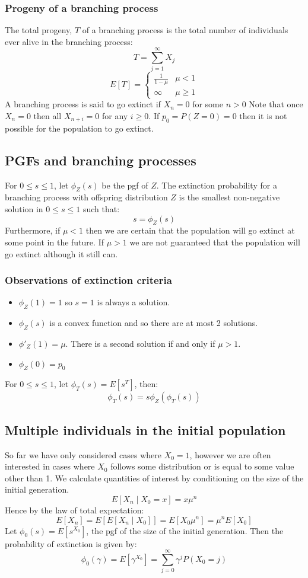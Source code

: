 \documentclass[12pt]{article}
\begin{document}
\subsubsection*{Progeny of a branching process}
The total progeny, \(T\) of a branching process is the total number of individuals ever alive in the branching process:
\[T=\sum^\infty_{j=1}X_j\]
\[E[T]=\begin{cases}
    \frac{1}{1-\mu} & \mu<1 \\
    \infty & \mu\geq 1
\end{cases}\]
A branching process is said to go extinct if \(X_n=0\) for some \(n>0\) Note that once \(X_n=0\) then all \(X_{n+i}=0\) for any \(i\geq 0\). If \(p_0=P(Z=0)=0\) then it is not possible for the population to go extinct.
\subsection*{PGFs and branching processes}
For \(0\leq s\leq 1\), let \(\phi_Z(s)\) be the pgf of \(Z\). The extinction probability for a branching process with offspring distribution \(Z\) is the smallest non-negative solution in \(0\leq s\leq 1\) such that:
\[s=\phi_Z(s)\]
Furthermore, if \(\mu<1\) then we are certain that the population will go extinct at some point in the future. If \(\mu>1\) we are not guaranteed that the population will go extinct although it still can.
\subsubsection*{Observations of extinction criteria}
\begin{itemize}
    \item \(\phi_Z(1)=1\) so \(s=1\) is always a solution.
    \item \(\phi_Z(s)\) is a convex function and so there are at most 2 solutions.
    \item \(\phi'_Z(1)=\mu\). There is a second solution if and only if \(\mu>1\).
    \item \(\phi_Z(0)=p_0\)
\end{itemize}
For \(0\leq s\leq 1\), let \(\phi_T(s)=E[s^T]\), then:
\[\phi_T(s)=s\phi_Z(\phi_T(s))\]
\subsection*{Multiple individuals in the initial population}
So far we have only considered cases where \(X_0=1\), however we are often interested in cases where \(X_0\) follows some distribution or is equal to some value other than 1. We calculate quantities of interest by conditioning on the size of the initial generation.
\[E[X_n\mid X_0=x]=x\mu^n\]
Hence by the law of total expectation:
\[E[X_n]=E[E[X_n\mid X_0]]=E[X_0\mu^n]=\mu^nE[X_0]\]
Let \(\phi_0(s)=E[s^{X_0}]\), the pgf of the size of the initial generation. Then the probability of extinction is given by:
\[\phi_0(\gamma)=E[\gamma^{X_0}]=\sum^\infty_{j=0}\gamma^jP(X_0=j)\]
\end{document}
